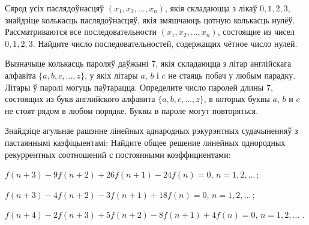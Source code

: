 \documentclass[12pt, a4paper]{article}
\begin{document}
\begin{problemList}
\medskip

\problemItemSimple
{Сярод усіх паслядоўнасцяў $(x_1, x_2, \ldots, x_n)$, якія складаюцца з лікаў
$0, 1, 2, 3$, знайдзіце колькасць паслядоўнасцяў, якія змяшчаюць цотную колькасць нулёў.}
{Рассматриваются все последовательности $(x_1, x_2, \ldots, x_n)$,
состоящие из чисел $0, 1, 2, 3$. Найдите число последовательностей,
содержащих чётное число нулей.}

\medskip

\problemItemSimple
{Вызначыце колькасць пароляў даўжыні 7, якія складаюцца з літар англійскага алфавіта
$\{a, b, c, \ldots, z\}$, у якіх літары $a$, $b$ і $c$ не стаяць побач у любым парадку.
Літары ў паролі могуць паўтарацца.}
{Определите число паролей длины 7, состоящих из букв английского
алфавита $\{a, b, c, \ldots, z\}$, в которых буквы $a$, $b$ и $c$ не
стоят рядом в любом порядке. Буквы в пароле могут повторяться.}

\medskip

\problemItemWithCommonPart
{Знайдзіце агульнае рашэнне лінейных аднародных рэкурэнтных судачыненняў з пастаяннымі каэфіцыентамі:}
{Найдите общее решение линейных однородных рекуррентных соотношений с
постоянными коэффициентами:}
{%
\begin{belarusianEnumerate}
    \item $f(n + 3) - 9f(n + 2) + 26f(n + 1) - 24f(n) = 0$, $n = 1, 2, \ldots\, $;
    \item $f(n + 3) - 4f(n + 2) - 3f(n + 1) + 18f(n) = 0$, $n = 1, 2, \ldots\, $;
    \item $f(n + 4) - 2f(n + 3) + 5f(n + 2) - 8f(n + 1) + 4f(n) = 0$, $n = 1, 2, \ldots\,\, $.
\end{belarusianEnumerate}
}

\end{problemList}
\end{document}
